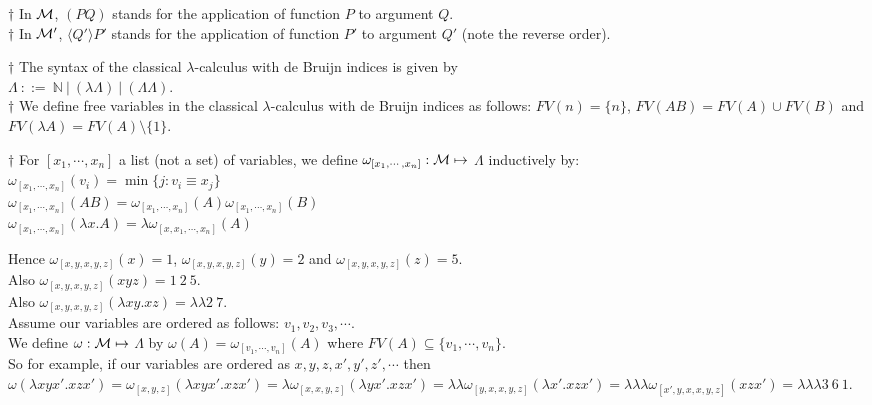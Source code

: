 \documentclass[11pt]{article}
\begin{document}
$\dagger$ In ${\cal M}$, $(PQ)$ stands for the application of function $P$ to argument $Q$.\\
$\dagger$ In ${\cal M}'$, $\langle Q'\rangle P'$ stands for the application of function $P'$ to argument $Q'$ (note the reverse order).

$\dagger$ The syntax of the classical $\lambda$-calculus with de Bruijn indices is given by\\
$\Lambda  \: ::=  \:  {\mathbb{N}} \:|\: ( \lambda{}{\Lambda}) \:|\: ( \Lambda \Lambda)$.\\

$\dagger$ We define free variables in 
the classical $\lambda$-calculus with de Bruijn indices as follows:
$FV(n) = \{n\}$, $FV(AB) = FV(A)\cup FV(B)$ and $FV(\lambda A) = FV(A)\setminus\{1\}$.

$\dagger$  For $[x_1,\cdots, x_n]$ a list (not a set) of variables, 
we define $\omega_{[x_1,\cdots, x_n]}: {\cal M} \mapsto$ $\Lambda$ inductively by:\\
$\omega_{[x_1,\cdots, x_n]}(v_i) = \min\{j:v_i \equiv x_j\}$\\
$\omega_{[x_1,\cdots, x_n]}(AB) = \omega_{[x_1,\cdots, x_n]}(A)\omega_{[x_1,\cdots, x_n]}(B)$\\
$\omega_{[x_1,\cdots, x_n]}(\lambda x.A)= \lambda \omega_{[x,x_1,\cdots, x_n]}(A)$

Hence $\omega_{[x, y, x,y,z]}(x) = 1$, $\omega_{[x, y, x,y,z]}(y) = 2$ and $\omega_{[x, y, x,y,z]}(z) = 5$.\\
Also $\omega_{[x, y, x,y,z]}(xyz) = 1\:2\:5$.\\
Also $\omega_{[x, y, x,y,z]}(\lambda xy.xz) = \lambda \lambda 2\:7$.\\

Assume our variables are ordered as follows: $v_1, v_2, v_3, \cdots$.\\
We define $\omega : {\cal M} \mapsto$ $\Lambda$
by $\omega(A) = \omega_{[v_1,\cdots, v_n]}(A)$ where 
$FV(A) \subseteq \{v_1,\cdots,v_n\}$.\\
So for example, if our variables are ordered as $x,y,z,x',y',z', \cdots$ then $\omega(\lambda xyx'.xzx')
= \omega_{[x,y,z]}(\lambda xyx'.xzx') = \lambda\omega_{[x,x,y,z]}(\lambda yx'.xzx') = \lambda\lambda\omega_{[y,x,x,y,z]}(\lambda x'.xzx') = \lambda\lambda\lambda\omega_{[x',y,x,x,y,z]}(xzx') = \lambda\lambda\lambda 3\:6\:1$.
\end{document}
